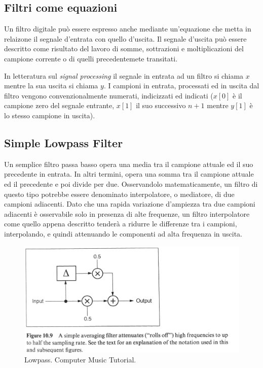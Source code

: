 \subsection{Filtri come equazioni}

Un filtro digitale può essere espresso anche mediante un'equazione che metta in
relaizone il segnale d'entrata con quello d'uscita. Il segnale d'uscita può essere
descritto come risultato del lavoro di somme, sottrazioni e moltiplicazioni del
campione corrente o di quelli precedentemete transitati.

In letteratura sul \emph{signal processing} il segnale in entrata ad un filtro si
chiama $ x $ mentre la sua uscita si chiama $ y $. I campioni in entrata, processati
ed in uscita dal filtro vengono convenzionalmente numerati, indicizzati ed indicati
($ x[0] $ è il campione zero del segnale entrante, $ x[1] $ il suo successivo
$ n+1 $ mentre $ y[1] $ è lo stesso campione in uscita).

\subsection{Simple Lowpass Filter}

Un semplice filtro passa basso opera una media tra il campione attuale ed il suo
precedente in entrata. In altri termini, opera una somma tra il campione attuale
ed il precedente e poi divide per due. Osservandolo matematicamente, un filtro di
questo tipo potrebbe essere denominato interpolatore, o mediatore, di due
campioni adiacenti. Dato che una rapida variazione d'ampiezza tra due campioni
adiacenti è osservabile solo in presenza di alte frequenze, un filtro interpolatore
come quello appena descritto tenderà a ridurre le differenze tra i campioni,
interpolando, e quindi attenuando le componenti ad alta frequenza in uscita.

\begin{figure}[ht]
  \centering
  \includegraphics[width=\textwidth]{CAPITOLI/0500/IMG/CT_Lowpass.pdf}
  \caption{Lowpass. Computer Music Tutorial.}
  \label{CT-Lowpass}
\end{figure}


